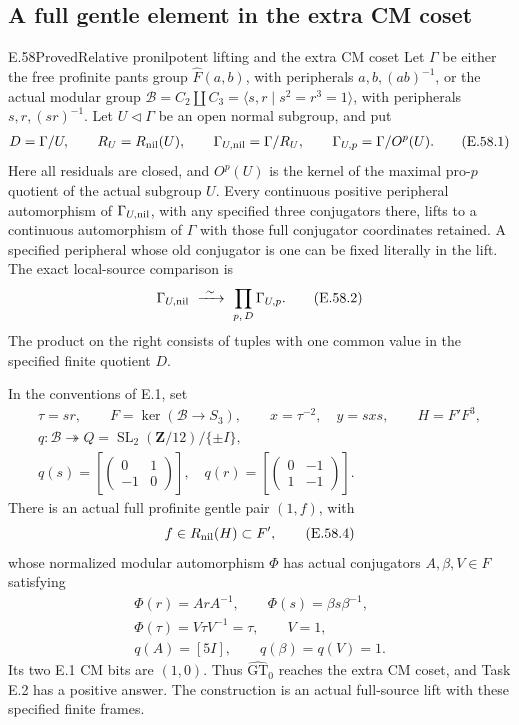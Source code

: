 \subsection{A full gentle element in the extra CM coset}

\begin{statement}{E.58}{Proved}{Relative pronilpotent lifting and the extra CM coset}
Let \(\Gamma\) be either the free profinite pants group
\(\widehat F(a,b)\), with peripherals \(a,b,(ab)^{-1}\),
or the actual modular group
\(\mathcal B=C_2\amalg C_3=\langle s,r\mid s^2=r^3=1\rangle\),
with peripherals \(s,r,(sr)^{-1}\).
Let \(U\triangleleft\Gamma\) be an open normal subgroup, and put
\[
 \begin{gathered}
 D=\Gamma/U,\qquad R_U=R_{\rm nil}(U),\qquad
 \Gamma_{U,\rm nil}=\Gamma/R_U,\qquad
 \Gamma_{U,p}=\Gamma/O^p(U).
 \end{gathered}
 \tag{E.58.1}
\]
Here all residuals are closed, and \(O^p(U)\) is the kernel
of the maximal pro-\(p\) quotient of the actual subgroup \(U\).
Every continuous positive peripheral automorphism of
\(\Gamma_{U,\rm nil}\), with any specified three conjugators
there, lifts to a continuous automorphism of \(\Gamma\) with
those full conjugator coordinates retained. A specified peripheral
whose old conjugator is one can be fixed literally in the lift.
The exact local-source comparison is
\[
 \Gamma_{U,\rm nil}
       \ \xrightarrow{\ \sim\ }\ 
       \mathop{\prod}_{p,\,D}\Gamma_{U,p}.
 \tag{E.58.2}
\]
The product on the right consists of tuples with one common value
in the specified finite quotient \(D\).

In the conventions of E.1, set
\[
 \begin{gathered}
 \tau=sr,\qquad F=\ker(\mathcal B\to S_3),\qquad
 x=\tau^{-2},\quad y=sxs,\qquad H=F'F^3,\\
 q:\mathcal B\twoheadrightarrow
 Q=\operatorname{SL}_2(\mathbf Z/12)/\{\pm I\},\\
 q(s)=\left[\begin{pmatrix}0&1\\-1&0\end{pmatrix}\right],\quad
 q(r)=\left[\begin{pmatrix}0&-1\\1&-1\end{pmatrix}\right].
 \end{gathered}
 \tag{E.58.3}
\]
There is an actual full profinite gentle pair \((1,f)\), with
\[
 f\in R_{\rm nil}(H)\subset F',
 \tag{E.58.4}
\]
whose normalized modular automorphism \(\Phi\) has actual
conjugators \(A,\beta,V\in F\) satisfying
\[
 \begin{gathered}
 \Phi(r)=ArA^{-1},\qquad
 \Phi(s)=\beta s\beta^{-1},\\
 \Phi(\tau)=V\tau V^{-1}=\tau,\qquad V=1,\\
 q(A)=[5I],\qquad q(\beta)=q(V)=1.
 \end{gathered}
 \tag{E.58.5}
\]
Its two E.1 CM bits are \((1,0)\). Thus
\(\widehat{\mathrm{GT}}_0\) reaches the extra CM coset,
and Task E.2 has a positive answer.
The construction is an actual full-source lift with these
specified finite frames.
\end{statement}

